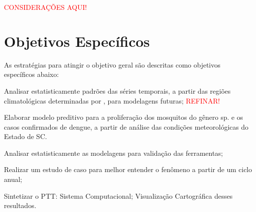 \begin{center}
\textcolor{red}{CONSIDERAÇÕES AQUI!}\\ 
\end{center}



 
\section{Objetivos Específicos}
As estratégias para atingir o objetivo geral são descritas como objetivos específicos abaixo:

\begin{alineas}
\item Analisar estatisticamente padrões das séries temporais, a partir das regiões climatológicas determinadas por , para modelagens futuras; \textcolor{red}{REFINAR!}
\item Elaborar modelo preditivo para a proliferação dos mosquitos do gênero  sp. e os casos confirmados de dengue, a partir de análise das condições meteorológicas do Estado de \acrlong{SC}.
\item Analisar estatisticamente as modelagens para validação das ferramentas;
\item Realizar um estudo de caso para melhor entender o fenômeno a partir de um ciclo anual;
\item Sintetizar o \acrfull{PTT}:
\subitem Sistema Computacional;
\subitem Visualização Cartográfica desses resultados.
\end{alineas}
